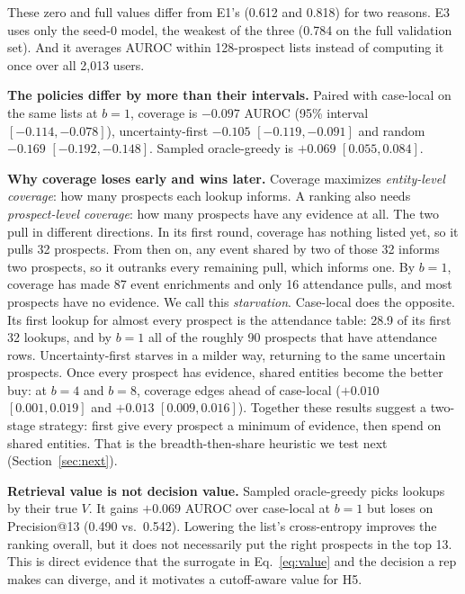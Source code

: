\documentclass{article}
\begin{document}
These zero and full values differ from E1's (0.612 and 0.818) for two reasons. E3 uses only the seed-0 model, the weakest of the three (0.784 on the full validation set). And it averages AUROC within 128-prospect lists instead of computing it once over all 2,013 users.

\textbf{The policies differ by more than their intervals.} Paired with case-local on the same lists at $b = 1$, coverage is $-0.097$ AUROC (95\% interval $[-0.114, -0.078]$), uncertainty-first $-0.105$ $[-0.119, -0.091]$ and random $-0.169$ $[-0.192, -0.148]$. Sampled oracle-greedy is $+0.069$ $[0.055, 0.084]$.

\textbf{Why coverage loses early and wins later.} Coverage maximizes \emph{entity-level coverage}: how many prospects each lookup informs. A ranking also needs \emph{prospect-level coverage}: how many prospects have any evidence at all. The two pull in different directions. In its first round, coverage has nothing listed yet, so it pulls 32 prospects. From then on, any event shared by two of those 32 informs two prospects, so it outranks every remaining pull, which informs one. By $b = 1$, coverage has made 87 event enrichments and only 16 attendance pulls, and most prospects have no evidence. We call this \emph{starvation}. Case-local does the opposite. Its first lookup for almost every prospect is the attendance table: 28.9 of its first 32 lookups, and by $b = 1$ all of the roughly 90 prospects that have attendance rows. Uncertainty-first starves in a milder way, returning to the same uncertain prospects. Once every prospect has evidence, shared entities become the better buy: at $b = 4$ and $b = 8$, coverage edges ahead of case-local ($+0.010$ $[0.001, 0.019]$ and $+0.013$ $[0.009, 0.016]$). Together these results suggest a two-stage strategy: first give every prospect a minimum of evidence, then spend on shared entities. That is the breadth-then-share heuristic we test next (Section~\ref{sec:next}).

\textbf{Retrieval value is not decision value.} Sampled oracle-greedy picks lookups by their true $V$. It gains $+0.069$ AUROC over case-local at $b = 1$ but loses on Precision@13 (0.490 vs.\ 0.542). Lowering the list's cross-entropy improves the ranking overall, but it does not necessarily put the right prospects in the top 13. This is direct evidence that the surrogate in Eq.~\ref{eq:value} and the decision a rep makes can diverge, and it motivates a cutoff-aware value for H5.
\end{document}
